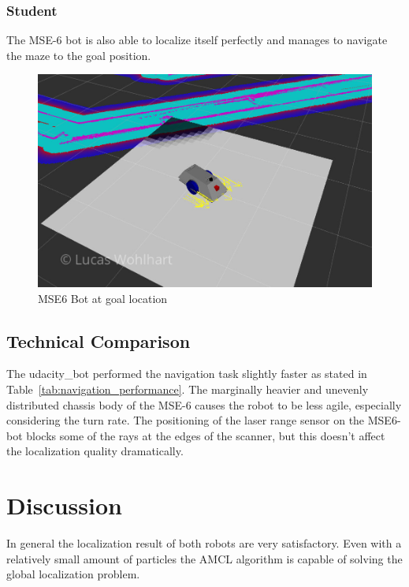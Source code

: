 \documentclass[10pt,journal,compsoc]{IEEEtran}
\begin{document}
\subsubsection{Student}

The MSE-6 bot is also able to localize itself perfectly and manages to navigate the maze to the goal position.

\begin{figure}[thpb]
      \centering
      \includegraphics[width=\linewidth]{img/lw_mse6_bot_goal_location}
      \caption{MSE6 Bot at goal location}
      \label{fig:mse6_bot_goal_location}
\end{figure}

\subsection{Technical Comparison} %
The udacity\_bot performed the navigation task slightly faster as stated in Table~\ref{tab:navigation_performance}. 
The marginally heavier and unevenly distributed chassis body of the MSE-6 causes the robot to be less agile, especially considering the turn rate. 
The positioning of the laser range sensor on the MSE6-bot blocks some of the rays at the edges of the scanner, but this doesn't affect the localization quality dramatically.

\section{Discussion}
In general the localization result of both robots are very satisfactory. Even with a relatively small amount of particles the AMCL algorithm is capable of solving the global localization problem.
\end{document}
